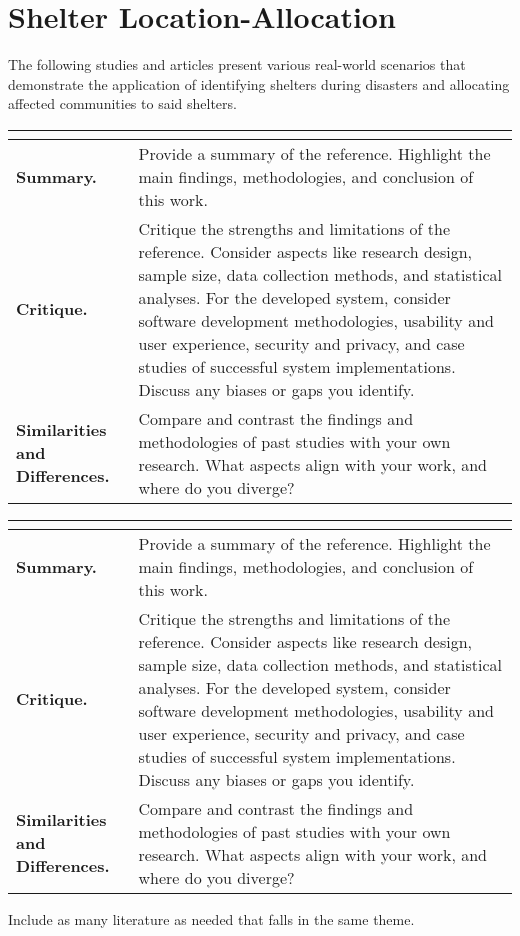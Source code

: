 \section{Shelter Location-Allocation}

The following studies and articles present various real-world scenarios that demonstrate the application of identifying shelters during disasters and allocating affected communities to said shelters.

\begin{longtable}{|L{.2\linewidth}|L{.74\linewidth}|}
	\hline
	\\ \hline
	\textbf{Summary.} & Provide a summary of the reference. Highlight the main findings, methodologies, and conclusion of this work.\\ \hline
	\textbf{Critique.} & Critique the strengths and limitations of the reference. Consider aspects like research design, sample size, data collection methods, and statistical analyses. For the developed system, consider software development methodologies, usability and user experience, security and privacy, and case studies of successful system implementations. Discuss any biases or gaps you identify.\\ \hline
	\textbf{Similarities and Differences.} & Compare and contrast the findings and methodologies of past studies with your own research. What aspects align with your work, and where do you diverge?\\ \hline
\end{longtable}

\begin{longtable}{|L{.2\linewidth}|L{.74\linewidth}|}
	\hline
	\\ \hline
	\textbf{Summary.} & Provide a summary of the reference. Highlight the main findings, methodologies, and conclusion of this work.\\ \hline
	\textbf{Critique.} & Critique the strengths and limitations of the reference. Consider aspects like research design, sample size, data collection methods, and statistical analyses. For the developed system, consider software development methodologies, usability and user experience, security and privacy, and case studies of successful system implementations. Discuss any biases or gaps you identify.\\ \hline
	\textbf{Similarities and Differences.} & Compare and contrast the findings and methodologies of past studies with your own research. What aspects align with your work, and where do you diverge?\\ \hline
\end{longtable}

Include as many literature as needed that falls in the same theme.



